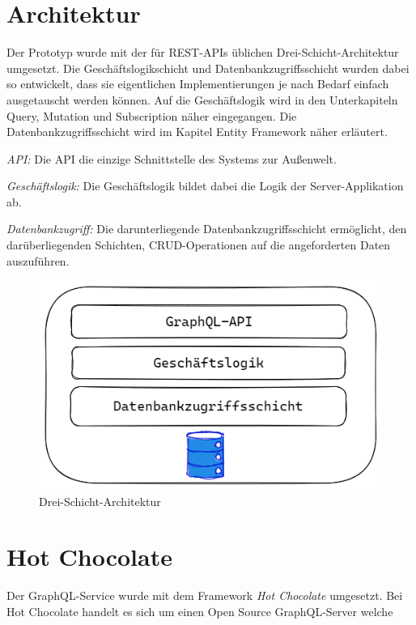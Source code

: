 \section{Architektur}
Der Prototyp wurde mit der für REST-APIs üblichen Drei-Schicht-Architektur umgesetzt.
Die Geschäftslogikschicht und Datenbankzugriffsschicht wurden dabei so entwickelt, dass sie eigentlichen Implementierungen je nach Bedarf einfach ausgetauscht werden können.
Auf die Geschäftslogik wird in den Unterkapiteln Query, Mutation und Subscription näher eingegangen. Die Datenbankzugriffsschicht wird im Kapitel Entity Framework näher erläutert.
\newline

\textit{API:}
Die API die einzige Schnittstelle des Systems zur Außenwelt.
\newline

\textit{Geschäftslogik:}
Die Geschäftslogik bildet dabei die Logik der Server-Applikation ab.
\newline

\textit{Datenbankzugriff:}
Die darunterliegende Datenbankzugriffsschicht ermöglicht, den darüberliegenden Schichten, CRUD-Operationen auf die angeforderten Daten auszuführen.
\newline

\begin{figure}[H]
    \includegraphics[width=\textwidth]{pics/architecture.png}
    \caption{Drei-Schicht-Architektur}
\end{figure}

\section{Hot Chocolate}
Der GraphQL-Service wurde mit dem Framework \textit{Hot Chocolate} umgesetzt.
Bei Hot Chocolate handelt es sich um einen Open Source GraphQL-Server welche 

